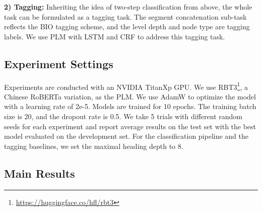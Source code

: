 \documentclass[runningheads]{llncs}
\begin{document}
\textbf{2) Tagging:}
Inheriting the idea of two-step classification from above, the whole task can be formulated as a tagging task.
The segment concatenation sub-task reflects the BIO tagging scheme, and the level depth and node type are tagging labels.
We use PLM with LSTM and CRF to address this tagging task.

\subsection{Experiment Settings}

Experiments are conducted with an NVIDIA TitanXp GPU.
We use RBT3\footnote{\url{https://huggingface.co/hfl/rbt3}}, a Chinese RoBERTa variation, as the PLM.
We use AdamW \cite{adamw} to optimize the model with a learning rate of 2e-5.
Models are trained for 10 epochs.
The training batch size is 20, and the dropout rate is 0.5.
We take 5 trials with different random seeds for each experiment and report average results on the test set with the best model evaluated on the development set.
For the classification pipeline and the tagging baselines, we set the maximal heading depth to 8.

\subsection{Main Results}
\end{document}
